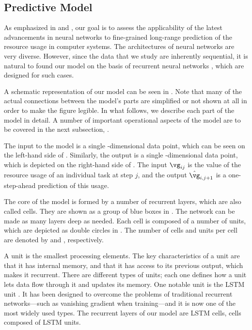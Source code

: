 \subsection{Predictive Model}

As emphasized in  and , our goal is
to assess the applicability of the latest advancements in neural networks
\cite{goodfellow2016} to fine-grained long-range prediction of the resource
usage in computer systems. The architectures of neural networks are very
diverse. However, since the data that we study are inherently sequential, it is
natural to found our model on the basis of recurrent neural networks
\cite{goodfellow2016}, which are designed for such cases.

A schematic representation of our model can be seen in . Note
that many of the actual connections between the model's parts are simplified or
not shown at all in order to make the figure legible. In what follows, we
describe each part of the model in detail. A number of important operational
aspects of the model are to be covered in the next subsection,
.

The input to the model is a single \ng-dimensional data point, which can be seen
on the left-hand side of . Similarly, the output is a single
\ng-dimensional data point, which is depicted on the right-hand side of
. The input $\vg_{ij}$ is the value of the resource usage of
an individual task at step $j$, and the output $\hat{\vg}_{i, j + 1}$ is a
one-step-ahead prediction of this usage.

The core of the model is formed by a number of recurrent layers, which are also
called cells. They are shown as a group of blue boxes in . The
network can be made as many layers deep as needed. Each cell is composed of a
number of units, which are depicted as double circles in . The
number of cells and units per cell are denoted by \nc and \nu, respectively.

A unit is the smallest processing elements. The key characteristics of a unit
are that it has internal memory, and that it has access to its previous output,
which makes it recurrent. There are different types of units; each one defines
how a unit lets data flow through it and updates its memory. One notable unit is
the \ac{LSTM} unit \cite{hochreiter1997}. It has been designed to overcome the
problems of traditional recurrent networks---such as vanishing gradient when
training---and it is now one of the most widely used types. The recurrent layers
of our model are \ac{LSTM} cells, cells composed of \ac{LSTM} units.

